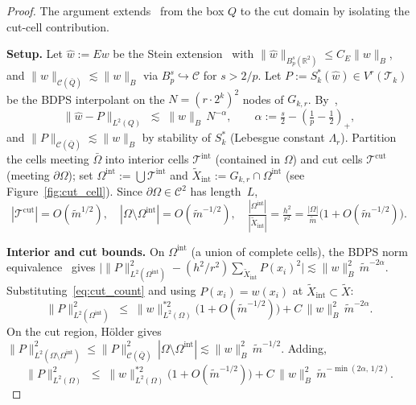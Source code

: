 \documentclass[11pt]{article}
\newcommand{\bOmg}{\partial\Omega}
\newcommand{\C}{\mathcal{C}}
\begin{document}
\begin{proof}
The argument extends~\cite[Lemma~6.1]{bonito2025} from the box $Q$ to
the cut domain by isolating the cut-cell contribution.
 
\medskip\noindent\textbf{Setup.}
Let $\hat{w}:=Ew$ be the Stein extension~\cite{Stein1970} with
$\|\hat{w}\|_{B^s_p(\mathbb{R}^2)}\le C_E\|w\|_B$, and
$\|\hat{w}\|_{\C(\bar Q)}\lesssim\|w\|_B$ via
$B^s_p\hookrightarrow\C$ for $s>2/p$. Let
$P:=S^*_k(\hat{w})\in V^r(\mathcal{T}_k)$ be the BDPS interpolant on
the $N=(r\cdot 2^k)^2$ nodes of $G_{k,r}$. By~\cite[Theorem~2.1]{bonito2025},
\begin{equation}\label{eq:approx_P}
  \|\hat{w}-P\|_{L^2(Q)}\;\lesssim\;\|w\|_B\,N^{-\alpha},
  \qquad
  \alpha:=\tfrac{s}{2}-(\tfrac{1}{p}-\tfrac{1}{2})_+,
\end{equation}
and $\|P\|_{\C(\bar Q)}\lesssim\|w\|_B$ by stability of $S^*_k$
(Lebesgue constant $\Lambda_r$). Partition the cells meeting
$\bar\Omega$ into interior cells $\mathcal{T}^{\mathrm{int}}$
(contained in $\Omega$) and cut cells $\mathcal{T}^{\mathrm{cut}}$
(meeting $\bOmg$); set
$\Omega^{\mathrm{int}}:=\bigcup\mathcal{T}^{\mathrm{int}}$ and
$\tilde{X}_{\mathrm{int}}:=G_{k,r}\cap\Omega^{\mathrm{int}}$
(see Figure~\ref{fig:cut_cell}). Since $\bOmg\in\C^2$ has length~$L$,
\begin{equation}\label{eq:cut_count}
  |\mathcal{T}^{\mathrm{cut}}|=O(\tilde m^{1/2}),
  \quad
  |\Omega\setminus\Omega^{\mathrm{int}}|=O(\tilde m^{-1/2}),
  \quad
  \tfrac{|\Omega^{\mathrm{int}}|}{|\tilde X_{\mathrm{int}}|}
  =\tfrac{h^2}{r^2}
  =\tfrac{|\Omega|}{\tilde m}\bigl(1+O(\tilde m^{-1/2})\bigr).
\end{equation}
 
\medskip\noindent\textbf{Interior and cut bounds.}
On $\Omega^{\mathrm{int}}$ (a union of complete cells), the BDPS
norm equivalence~\cite[Lemma~6.1]{bonito2025} gives
$\bigl|\|P\|^2_{L^2(\Omega^{\mathrm{int}})}-(h^2/r^2)\sum_{\tilde X_{\mathrm{int}}}P(x_i)^2\bigr|
\lesssim\|w\|^2_B\,\tilde m^{-2\alpha}$. Substituting~\eqref{eq:cut_count}
and using $P(x_i)=w(x_i)$ at
$\tilde X_{\mathrm{int}}\subset\tilde X$:
\begin{equation}\label{eq:int_to_disc}
  \|P\|^2_{L^2(\Omega^{\mathrm{int}})}
  \;\le\;\|w\|^{*2}_{L^2(\Omega)}\bigl(1+O(\tilde m^{-1/2})\bigr)
   + C\,\|w\|^2_B\,\tilde m^{-2\alpha}.
\end{equation}
On the cut region, H\"older gives
$\|P\|^2_{L^2(\Omega\setminus\Omega^{\mathrm{int}})}
\le\|P\|^2_{\C(\bar Q)}\,|\Omega\setminus\Omega^{\mathrm{int}}|
\lesssim\|w\|^2_B\,\tilde m^{-1/2}$. Adding,
\begin{equation}\label{eq:full_P_bound}
  \|P\|^2_{L^2(\Omega)}
  \;\le\;\|w\|^{*2}_{L^2(\Omega)}\bigl(1+O(\tilde m^{-1/2})\bigr)
   + C\,\|w\|^2_B\,\tilde m^{-\min(2\alpha,\,1/2)}.
\end{equation}
 

\end{proof}
\end{document}

